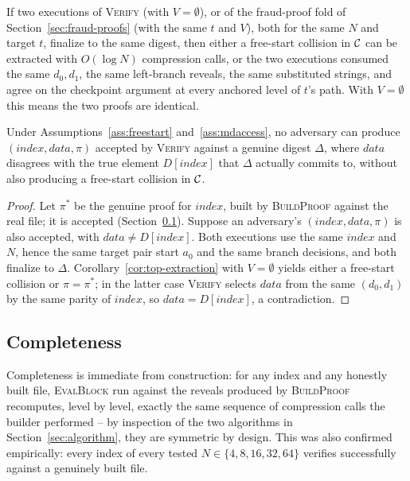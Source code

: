 \begin{corollary}
\label{cor:top-extraction}
If two executions of \textsc{Verify} (with $V = \emptyset$), or of the
fraud-proof fold of Section~\ref{sec:fraud-proofs} (with the same $t$ and
$V$), both for the same $N$ and target $t$, finalize to the same digest,
then either a free-start collision in $\mathcal{C}$ can be extracted with $O(\log
N)$ compression calls, or the two executions consumed the same $d_0, d_1$,
the same left-branch reveals, the same substituted strings, and agree on
the checkpoint argument at every anchored level of $t$'s path. With $V =
\emptyset$ this means the two proofs are identical.
\end{corollary}

\begin{theorem}[Soundness]
\label{thm:soundness}
Under Assumptions~\ref{ass:freestart} and~\ref{ass:mdaccess}, no adversary
can produce $(\mathit{index}, \mathit{data}, \pi)$ accepted by
\textsc{Verify} against a genuine digest $\Delta$, where $\mathit{data}$
disagrees with the true element $D[\mathit{index}]$ that $\Delta$ actually
commits to, without also producing a free-start collision in $\mathcal{C}$.
\end{theorem}

\begin{proof}
Let $\pi^*$ be the genuine proof for $\mathit{index}$, built by
\textsc{BuildProof} against the real file; it is accepted
(Section~\ref{sec:completeness}). Suppose an adversary's
$(\mathit{index}, \mathit{data}, \pi)$ is also accepted, with
$\mathit{data} \ne D[\mathit{index}]$. Both executions use the same
$\mathit{index}$ and $N$, hence the same target pair start $a_0$ and the
same branch decisions, and both finalize to $\Delta$.
Corollary~\ref{cor:top-extraction} with $V = \emptyset$ yields either a
free-start collision or $\pi = \pi^*$; in the latter case \textsc{Verify}
selects $\mathit{data}$ from the same $(d_0,d_1)$ by the same parity of
$\mathit{index}$, so $\mathit{data} = D[\mathit{index}]$, a contradiction.
\end{proof}

\subsection{Completeness}
\label{sec:completeness}

Completeness is immediate from construction: for any index and any honestly
built file, \textsc{EvalBlock} run against the reveals produced by
\textsc{BuildProof} recomputes, level by level, exactly the same sequence of
compression calls the builder performed -- by inspection of the two
algorithms in Section~\ref{sec:algorithm}, they are symmetric by design.
This was also confirmed empirically: every index of every tested $N \in
\{4,8,16,32,64\}$ verifies successfully against a genuinely built file.

